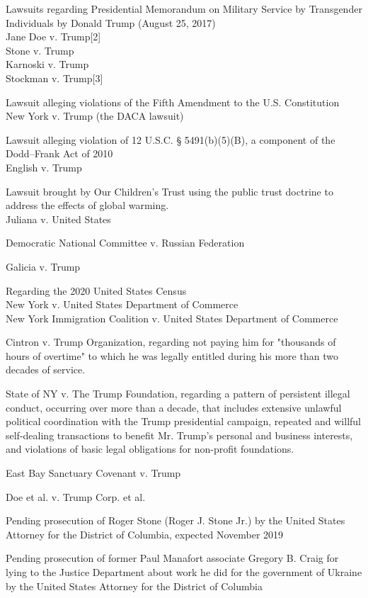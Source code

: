 Lawsuits regarding Presidential Memorandum on Military Service by
Transgender Individuals by Donald Trump (August 25, 2017)\\
Jane Doe v. Trump{[}2{]}\\
Stone v. Trump\\
Karnoski v. Trump\\
Stockman v. Trump{[}3{]}

Lawsuit alleging violations of the Fifth Amendment to the U.S.
Constitution\\
New York v. Trump (the DACA lawsuit)

Lawsuit alleging violation of 12 U.S.C. § 5491(b)(5)(B), a component of
the Dodd--Frank Act of 2010\\
English v. Trump

Lawsuit brought by Our Children's Trust using the public trust doctrine
to address the effects of global warming.\\
Juliana v. United States

Democratic National Committee v. Russian Federation

Galicia v. Trump

Regarding the 2020 United States Census\\
New York v. United States Department of Commerce\\
New York Immigration Coalition v. United States Department of Commerce

Cintron v. Trump Organization, regarding not paying him for "thousands
of hours of overtime" to which he was legally entitled during his more
than two decades of service.

State of NY v. The Trump Foundation, regarding a pattern of persistent
illegal conduct, occurring over more than a decade, that includes
extensive unlawful political coordination with the Trump presidential
campaign, repeated and willful self-dealing transactions to benefit Mr.
Trump's personal and business interests, and violations of basic legal
obligations for non-profit foundations.

East Bay Sanctuary Covenant v. Trump

Doe et al. v. Trump Corp. et al.

Pending prosecution of Roger Stone (Roger J. Stone Jr.) by the United
States Attorney for the District of Columbia, expected November 2019

Pending prosecution of former Paul Manafort associate Gregory B. Craig
for lying to the Justice Department about work he did for the government
of Ukraine by the United States Attorney for the District of Columbia

